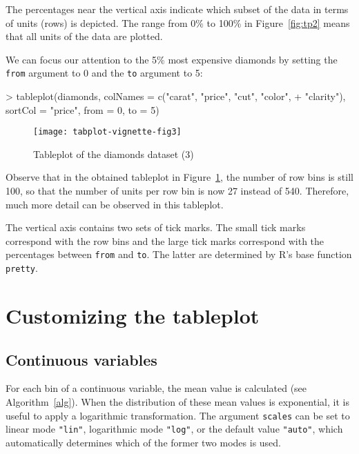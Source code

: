 \documentclass[11pt, fleqn, a4paper]{article}
\begin{document}
The percentages near the vertical axis indicate which subset of the data in terms of units (rows) is depicted. The range from 0\% to 100\% in Figure~\ref{fig:tp2} means that all units of the data are plotted. 


We can focus our attention to the 5\% most expensive diamonds by setting the {\tt from} argument to 0 and the {\tt to} argument to 5:

\begin{Schunk}
\begin{Sinput}
> tableplot(diamonds, colNames = c("carat", "price", "cut", "color", 
+     "clarity"), sortCol = "price", from = 0, to = 5)
\end{Sinput}
\end{Schunk}

\begin{figure}[htp]
\begin{center}
\texttt{[image: tabplot-vignette-fig3]}
\end{center}
\caption{Tableplot of the diamonds dataset (3)}
\label{fig:tp3}
\end{figure}


Observe that in the obtained tableplot in Figure~\ref{fig:tp3}, the number of row bins is still 100, so that the number of units per row bin is now 27 instead of 540. Therefore, much more detail can be observed in this tableplot.

The vertical axis contains two sets of tick marks. The small tick marks correspond with the row bins and the large tick marks correspond with the percentages between {\tt from} and {\tt to}. The latter are determined by R's base function {\tt pretty}.


\section{Customizing the tableplot}


\subsection{Continuous variables}

For each bin of a continuous variable, the mean value is calculated (see Algorithm~\ref{alg}).
When the distribution of these mean values is exponential, it is useful to apply a logarithmic transformation. The argument {\tt scales} can be set to linear mode {\tt "lin"}, logarithmic mode {\tt "log"}, or the default value {\tt "auto"}, which automatically determines which of the former two modes is used.
\end{document}
